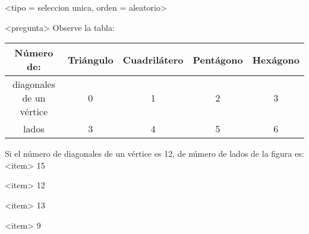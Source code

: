 <tipo = seleccion unica, orden = aleatorio>

<pregunta>
Observe la tabla:
\begin{center}
\begin{tabular}{ccccc} \toprule
Número de: & Triángulo & Cuadrilátero & Pentágono & Hexágono \\ \midrule
diagonales de un vértice & 0 & 1 & 2 & 3 \\
lados & 3  & 4 & 5 & 6 \\ \bottomrule
\end{tabular}
\end{center}
Si el número de diagonales de un vértice es 12, de número de lados de la figura es: \\[1ex]

<item>
15

<item>
12

<item>
13

<item>
9

